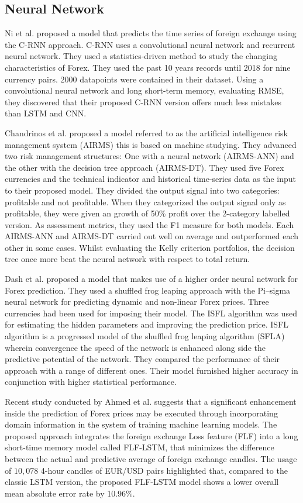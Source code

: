 \subsection{Neural Network}
Ni et al. \cite{Ni19} proposed a model that predicts the time series of foreign exchange using the C-RNN approach. C-RNN uses a convolutional neural network and recurrent neural network. They used a statistics-driven method to study the changing characteristics of Forex. They used the past 10 years records until 2018 for nine currency pairs. 2000 datapoints were contained in their dataset. Using a convolutional neural network and long short-term memory, evaluating RMSE, they discovered that their proposed C-RNN version offers much less mistakes than LSTM and CNN.

Chandrinos et al. \cite{Chandrinos18} proposed a model referred to as the artificial intelligence risk management system (AIRMS) this is based on machine studying. They advanced two risk management structures: One with a neural network (AIRMS-ANN) and the other with the decision tree approach (AIRMS-DT). They used five Forex currencies and the technical indicator and historical time-series data as the input to their proposed model. They divided the output signal into two categories: profitable and not profitable. When they categorized the output signal only as profitable, they were given an growth of 50\% profit over the 2-category labelled version. As assessment metrics, they used the F1 measure for both models. Each AIRMS-ANN and AIRMS-DT carried out well on average and outperformed each other in some cases. Whilst evaluating the Kelly criterion portfolios, the decision tree once more beat the neural network with respect to total return.

Dash et al. \cite{Dash18} proposed a model that makes use of a higher order neural network for Forex prediction. They used a shuffled frog leaping approach with the Pi–sigma neural network for predicting dynamic and non-linear Forex prices. Three currencies had been used for imposing their model. The ISFL algorithm was used for estimating the hidden parameters and improving the prediction price. ISFL algorithm is a progressed model of the shuffled frog leaping algorithm (SFLA) wherein convergence the speed of the network is enhanced along side the predictive potential of the network. They compared the performance of their approach with a range of different ones. Their model furnished higher accuracy in conjunction with higher statistical performance.

Recent study conducted by Ahmed et al. \cite{Ahmed20} suggests that a significant enhancement inside the prediction of Forex prices may be executed through incorporating domain information in the system of training machine learning models. The proposed approach integrates the foreign exchange Loss feature (FLF) into a long short-time memory model called FLF-LSTM, that minimizes the difference between the actual and predictive average of foreign exchange candles. The usage of $10,078$ 4-hour candles of EUR/USD pairs highlighted that, compared to the classic LSTM version, the proposed FLF-LSTM model shows a lower overall mean absolute error rate by 10.96\%.

